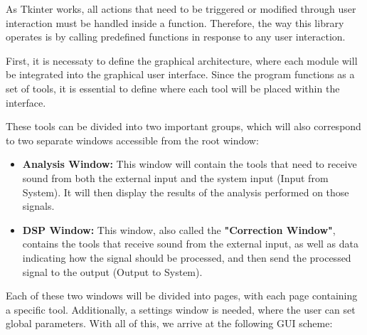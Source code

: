 As Tkinter works, all actions that need to be triggered or modified through user interaction must be handled inside a function. Therefore, the way this library operates is by calling predefined functions in response to any user interaction.

First, it is necessaty to define the graphical architecture, where each module will be integrated into the graphical user interface. Since the program functions as a set of tools, it is essential to define where each tool will be placed within the interface.

These tools can be divided into two important groups, which will also correspond to two separate windows accessible from the root window:

\begin{itemize}
	\item \textbf{Analysis Window:} This window will contain the tools that need to receive sound from both the external input and the system input (Input from System). It will then display the results of the analysis performed on those signals.
	\item \textbf{DSP Window:} This window, also called the \textbf{"Correction Window"}, contains the tools that receive sound from the external input, as well as data indicating how the signal should be processed, and then send the processed signal to the output (Output to System).
\end{itemize}

Each of these two windows will be divided into pages, with each page containing a specific tool. Additionally, a settings window is needed, where the user can set global parameters. With all of this, we arrive at the following GUI scheme:

